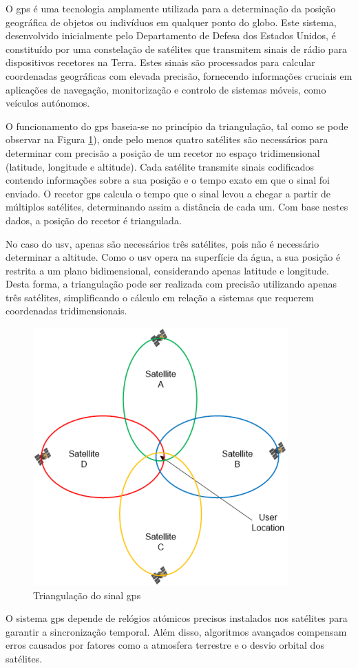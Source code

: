 O \gls{gps} é uma tecnologia amplamente utilizada para a determinação da posição geográfica de objetos ou indivíduos em qualquer ponto do globo. Este sistema, desenvolvido inicialmente pelo Departamento de Defesa dos Estados Unidos, é constituído por uma constelação de satélites que transmitem sinais de rádio para dispositivos recetores na Terra. Estes sinais são processados para calcular coordenadas geográficas com elevada precisão, fornecendo informações cruciais em aplicações de navegação, monitorização e controlo de sistemas móveis, como veículos autónomos.

O funcionamento do \gls{gps} baseia-se no princípio da triangulação, tal como se pode observar na Figura \ref{fig:triangulacao}), onde pelo menos quatro satélites são necessários para determinar com precisão a posição de um recetor no espaço tridimensional (latitude, longitude e altitude). Cada satélite transmite sinais codificados contendo informações sobre a sua posição e o tempo exato em que o sinal foi enviado. O recetor \gls{gps} calcula o tempo que o sinal levou a chegar a partir de múltiplos satélites, determinando assim a distância de cada um. Com base nestes dados, a posição do recetor é triangulada. 

No caso do \gls{usv}, apenas são necessários três satélites, pois não é necessário determinar a altitude. Como o \gls{usv} opera na superfície da água, a sua posição é restrita a um plano bidimensional, considerando apenas latitude e longitude. Desta forma, a triangulação pode ser realizada com precisão utilizando apenas três satélites, simplificando o cálculo em relação a sistemas que requerem coordenadas tridimensionais.

\begin{figure}[H]
    \centering
    \includegraphics[width=0.33\linewidth]{figuras/lowdop.png}
    \caption[Triangulação do sinal \gls{gps}]{Triangulação do sinal \gls{gps} \cite{help-gps}}
    \label{fig:triangulacao}
\end{figure}

O sistema \gls{gps} depende de relógios atómicos precisos instalados nos satélites para garantir a sincronização temporal. Além disso, algoritmos avançados compensam erros causados por fatores como a atmosfera terrestre e o desvio orbital dos satélites.

